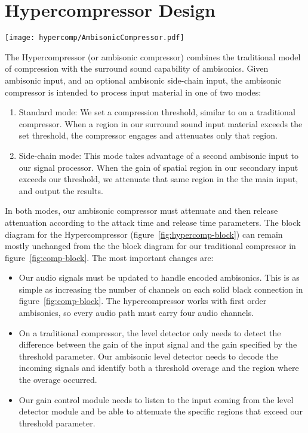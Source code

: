 \section{Hypercompressor Design}
\label{sec:hypercomp-design}
\begin{figure*}
  \texttt{[image: hypercomp/AmbisonicCompressor.pdf]}
  \caption{Hypercompressor block diagram}
  \label{fig:hypercomp-block}
\end{figure*}
\noindent The Hypercompressor (or ambisonic compressor) combines the traditional
model of compression with the surround sound capability of
ambisonics. Given ambisonic input, and an optional ambisonic
side-chain input, the ambisonic compressor is intended to process
input material in one of two modes:
\begin{enumerate}
\item Standard mode: We set a compression threshold, similar to on a
  traditional compressor. When a region in our surround sound input
  material exceeds the set threshold, the compressor engages and
  attenuates only that region.
\item Side-chain mode: This mode takes advantage of a second ambisonic
  input to our signal processor. When the gain of spatial region in
  our secondary input exceeds our threshold, we attenuate that same
  region in the the main input, and output the results.
\end{enumerate}
In both modes, our ambisonic compressor must attenuate and then release
attenuation according to the attack time and release time
parameters. The block diagram for the Hypercompressor
(figure~\ref{fig:hypercomp-block}) can remain mostly unchanged from
the the block diagram for our traditional compressor in
figure~\ref{fig:comp-block}. The most important changes are:
\begin{itemize}
\item Our audio signals must be updated to handle encoded
  ambisonics. This is as simple as increasing the number of channels
  on each solid black connection in figure~\ref{fig:comp-block}. The
  hypercompressor works with first order ambisonics, so every audio
  path must carry four audio channels.
\item On a traditional compressor, the level detector only needs to
  detect the difference between the gain of the input signal and the
  gain specified by the threshold parameter. Our ambisonic level detector
  needs to decode the incoming signals and identify both a threshold
  overage and the region where the overage occurred.
\item Our gain control module needs to listen to the input coming from
  the level detector module and be able to attenuate the specific
  regions that exceed our threshold parameter.
\end{itemize}

